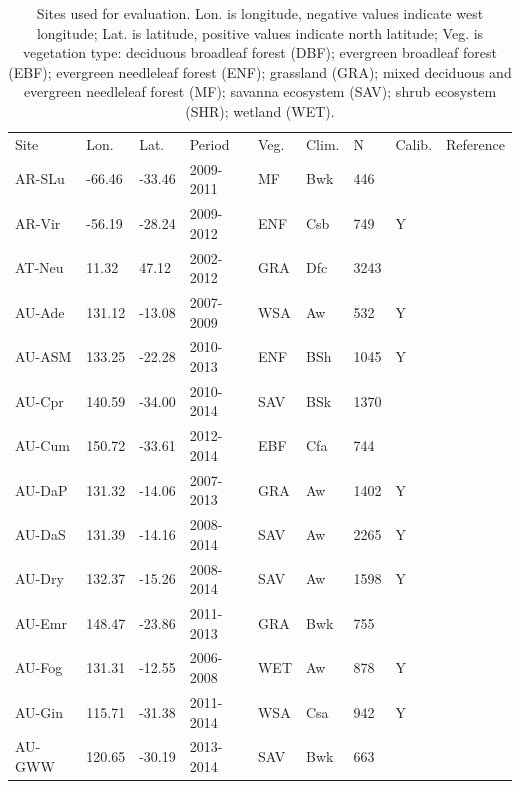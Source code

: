 \documentclass[gmd, manuscript]{copernicus}
\begin{document}
\appendixfigures  %

\appendixtables   %

\begin{table}[t]
\caption{Sites used for evaluation. Lon. is longitude, negative values indicate west longitude; Lat. is latitude, positive values indicate north latitude; Veg. is vegetation type: deciduous broadleaf forest (DBF); evergreen broadleaf forest (EBF); evergreen needleleaf forest (ENF); grassland (GRA); mixed deciduous and evergreen needleleaf forest (MF); savanna ecosystem (SAV); shrub ecosystem (SHR); wetland (WET).} 
\begin{tabular}{lllllllll}
  \tophline
  Site & Lon. & Lat. & Period & Veg. & Clim. & N & Calib. & Reference \\ 
  \middlehline
  AR-SLu & -66.46 & -33.46 & 2009-2011 & MF & Bwk & 446 &  & \citet{AR-SLu} \\ 
  AR-Vir & -56.19 & -28.24 & 2009-2012 & ENF & Csb & 749 & Y & \citet{AR-Vir} \\ 
  AT-Neu & 11.32 & 47.12 & 2002-2012 & GRA & Dfc & 3243 &  & \citet{AT-Neu} \\ 
  AU-Ade & 131.12 & -13.08 & 2007-2009 & WSA & Aw & 532 & Y & \citet{AU-Ade} \\ 
  AU-ASM & 133.25 & -22.28 & 2010-2013 & ENF & BSh & 1045 & Y & \citet{AU-ASM} \\ 
  AU-Cpr & 140.59 & -34.00 & 2010-2014 & SAV & BSk & 1370 &  & \citet{AU-Cpr} \\ 
  AU-Cum & 150.72 & -33.61 & 2012-2014 & EBF & Cfa & 744 &  & \citet{AU-Cum} \\ 
  AU-DaP & 131.32 & -14.06 & 2007-2013 & GRA & Aw & 1402 & Y & \citet{AU-DaP} \\ 
  AU-DaS & 131.39 & -14.16 & 2008-2014 & SAV & Aw & 2265 & Y & \citet{AU-DaS} \\ 
  AU-Dry & 132.37 & -15.26 & 2008-2014 & SAV & Aw & 1598 & Y & \citet{AU-Dry} \\ 
  AU-Emr & 148.47 & -23.86 & 2011-2013 & GRA & Bwk & 755 &  & \citet{AU-Emr} \\ 
  AU-Fog & 131.31 & -12.55 & 2006-2008 & WET & Aw & 878 & Y & \citet{AU-Fog} \\ 
  AU-Gin & 115.71 & -31.38 & 2011-2014 & WSA & Csa & 942 & Y & \citet{AU-Gin} \\ 
  AU-GWW & 120.65 & -30.19 & 2013-2014 & SAV & Bwk & 663 &  & \citet{AU-GWW} \\ 

\end{tabular}
\end{table}
\end{document}
